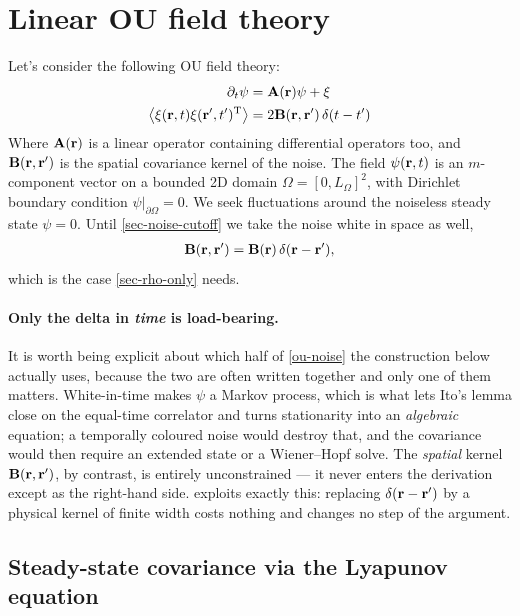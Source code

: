 \documentclass[a5paper]{article}
\begin{document}
\section{Linear OU field theory}
\label{sec-ou}
Let's consider the following OU field theory:
\begin{align}
    \label{ou-model}
    \partial_t \psi &= \mathbf{A}(\mathbf{r})\psi + \mathbf{\xi}
    \\
    \label{ou-noise}
    \left\langle \mathbf{\xi}(\mathbf{r}, t) \mathbf{\xi}(\mathbf{r}', t')^{\mathrm{T}} \right\rangle &= 2 \mathbf{B}(\mathbf{r},\mathbf{r}')\, \delta(t-t')
\end{align}
Where $\mathbf{A}(\mathbf{r})$ is a linear operator containing differential operators too, and $\mathbf{B}(\mathbf{r},\mathbf{r}')$ is the spatial covariance kernel of the noise. The field $\psi(\mathbf{r},t)$ is an $m$-component vector on a bounded 2D domain $\Omega = [0,L_\Omega]^2$, with Dirichlet boundary condition $\psi|_{\partial\Omega} = 0$. We seek fluctuations around the noiseless steady state $\psi = 0$. Until \cref{sec-noise-cutoff} we take the noise white in space as well,
\begin{align}
    \label{ou-noise-white}
    \mathbf{B}(\mathbf{r},\mathbf{r}') = \mathbf{B}(\mathbf{r})\,\delta(\mathbf{r}-\mathbf{r}'),
\end{align}
which is the case \cref{sec-rho-only} needs.

\paragraph{Only the delta in \emph{time} is load-bearing.} It is worth being explicit about which half of \eqref{ou-noise} the construction below actually uses, because the two are often written together and only one of them matters. White-in-time makes $\psi$ a Markov process, which is what lets Ito's lemma close on the equal-time correlator and turns stationarity into an \emph{algebraic} equation; a temporally coloured noise would destroy that, and the covariance would then require an extended state or a Wiener--Hopf solve. The \emph{spatial} kernel $\mathbf{B}(\mathbf{r},\mathbf{r}')$, by contrast, is entirely unconstrained --- it never enters the derivation except as the right-hand side.  exploits exactly this: replacing $\delta(\mathbf{r}-\mathbf{r}')$ by a physical kernel of finite width costs nothing and changes no step of the argument.

\subsection{Steady-state covariance via the Lyapunov equation}
\label{sec-lyapunov}
\end{document}

